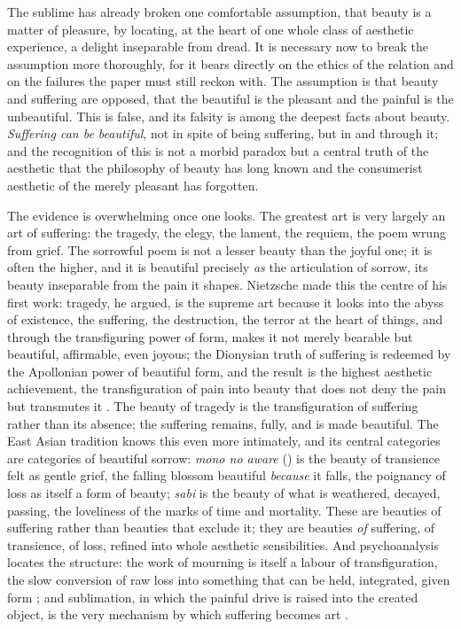 The sublime has already broken one comfortable assumption, that beauty is a matter of pleasure, by locating, at the heart of one whole class of aesthetic experience, a delight inseparable from dread. It is necessary now to break the assumption more thoroughly, for it bears directly on the ethics of the relation and on the failures the paper must still reckon with. The assumption is that beauty and suffering are opposed, that the beautiful is the pleasant and the painful is the unbeautiful. This is false, and its falsity is among the deepest facts about beauty. \emph{Suffering can be beautiful}, not in spite of being suffering, but in and through it; and the recognition of this is not a morbid paradox but a central truth of the aesthetic that the philosophy of beauty has long known and the consumerist aesthetic of the merely pleasant has forgotten.

The evidence is overwhelming once one looks. The greatest art is very largely an art of suffering: the tragedy, the elegy, the lament, the requiem, the poem wrung from grief. The sorrowful poem is not a lesser beauty than the joyful one; it is often the higher, and it is beautiful precisely \emph{as} the articulation of sorrow, its beauty inseparable from the pain it shapes. Nietzsche made this the centre of his first work: tragedy, he argued, is the supreme art because it looks into the abyss of existence, the suffering, the destruction, the terror at the heart of things, and through the transfiguring power of form, makes it not merely bearable but beautiful, affirmable, even joyous; the Dionysian truth of suffering is redeemed by the Apollonian power of beautiful form, and the result is the highest aesthetic achievement, the transfiguration of pain into beauty that does not deny the pain but transmutes it \parencite{nietzsche1967b}. The beauty of tragedy is the transfiguration of suffering rather than its absence; the suffering remains, fully, and is made beautiful. The East Asian tradition knows this even more intimately, and its central categories are categories of beautiful sorrow: \emph{mono no aware} () is the beauty of transience felt as gentle grief, the falling blossom beautiful \emph{because} it falls, the poignancy of loss as itself a form of beauty; \emph{sabi} is the beauty of what is weathered, decayed, passing, the loveliness of the marks of time and mortality. These are beauties of suffering rather than beauties that exclude it; they are beauties \emph{of} suffering, of transience, of loss, refined into whole aesthetic sensibilities. And psychoanalysis locates the structure: the work of mourning is itself a labour of transfiguration, the slow conversion of raw loss into something that can be held, integrated, given form \parencite{freud1957mourning}; and sublimation, in which the painful drive is raised into the created object, is the very mechanism by which suffering becomes art \parencite{lacan1992}.

